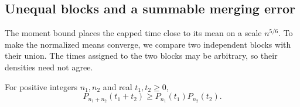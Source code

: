 \subsection{Unequal blocks and a summable merging error}

The moment bound places the capped time close to its mean on a scale
$n^{5/6}$. To make the normalized means converge, we compare two
independent blocks with their union. The times assigned to the two
blocks may be arbitrary, so their densities need not agree.

\begin{lemma}
\label{cp:interpolation}
For positive integers $n_1,n_2$ and real $t_1,t_2\ge0$,
\begin{equation}\label{cp:product-survival}
 P_{n_1+n_2}(t_1+t_2)
 \ge P_{n_1}(t_1)P_{n_2}(t_2).
\end{equation}
\end{lemma}


